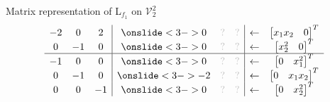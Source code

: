 \documentclass[10pt,T]{beamer}
\newcommand{\transparent}[1]{\textcolor{lightgray}{#1}}
\begin{document}
\begin{frame}[b]{Matrix representation of L$_{f_1}$ on $\mathcal{V}_2^2$}
\begin{equation*}
\begin{array}{ccc|ccc|cc}
    -2&0&2&\onslide<3->{0}&\transparent{?}&\transparent{?}&\leftarrow&\begin{bmatrix}x_1x_2&0\end{bmatrix}^T\\
    0&-1&0&\onslide<3->{0}&\transparent{?}&\transparent{?}&\leftarrow&\begin{bmatrix}x_2^2&0\end{bmatrix}^T\\\hline
    -1&0&0&\onslide<3->{0}&\transparent{?}&\transparent{?}&\leftarrow&\begin{bmatrix}0&x_1^2\end{bmatrix}^T\\
    0&-1&0&\onslide<3->{-2}&\transparent{?}&\transparent{?}&\leftarrow&\begin{bmatrix}0&x_1x_2\end{bmatrix}^T\\
    0&0&-1&\onslide<3->{0}&\transparent{?}&\transparent{?}&\leftarrow&\begin{bmatrix}0&x_2^2\end{bmatrix}^T
    \end{array}
\end{equation*}
\end{frame}
\end{document}
